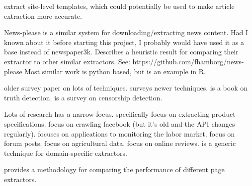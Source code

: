 \documentclass[11pt]{article}
\begin{document}
\cite{alarte2014automatic,alarte2015site,alarte2015analysis,wu2016web} extract site-level templates,
which could potentially be used to make article extraction more accurate.

News-please \cite{Hamborg2017} is a similar system for downloading/extracting news content.
Had I known about it before starting this project, I probably would have used it as a base instead of newspaper3k.
Describes a heuristic result for comparing their extractor to other similar extractors.
See: https://github.com/fhamborg/news-please
Most similar work is python based, but \cite{khalil2017rcrawler} is an example in R.

\cite{ferrara2014web} older survey paper on lots of techniques.
\cite{schulz2016practical,schulz2016practical} surveys newer techniques.
\cite{berti2015veracity} is a book on truth detection.
\cite{aceto2015internet} is a survey on censorship detection.

Lots of research has a narrow focus.
\cite{qiu2015dexter} specifically focus on extracting product specifications.
\cite{catanese2011crawling} focus on crawling facebook (but it's old and the API changes regularly).
\cite{bakaev2014data} focuses on applications to monitoring the labor market.
\cite{audeh2017vigi4med} focus on forum posts.
\cite{nguyen2017design} focus on agricultural data.
\cite{kraychev2012computationally} focus on online reviews.
\cite{shi2015autorm} is a generic technique for domain-specific extractors.

\cite{jimenez2016ariex} provides a methodology for comparing the performance of different page extractors.



\end{document}
